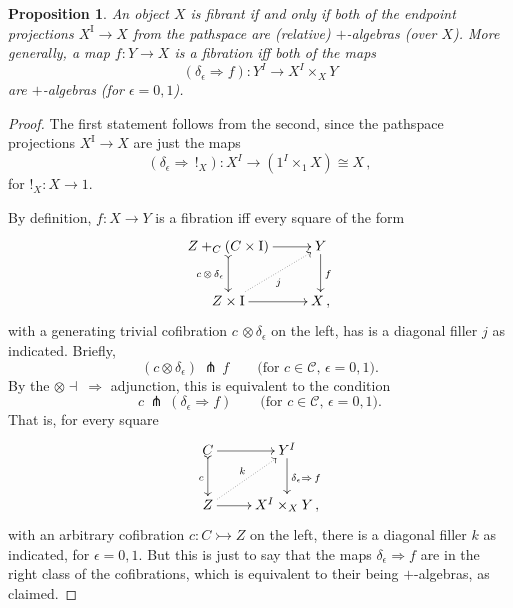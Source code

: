 \documentclass[12pt]{article}
\newcommand{\mono}{\ensuremath{\rightarrowtail}}
\newcommand{\ra}{\ensuremath{\rightarrow}}
\newcommand{\I}{\ensuremath{\mathrm{I}}}
\newtheorem{proposition}[theorem]{Proposition}
\theoremstyle{remark}
\theoremstyle{definition}
\begin{document}
\begin{proposition}\label{prop:algequivfill}
An object $X$ is fibrant if and only if both of the endpoint  projections $X^\I \ra X$ from the pathspace are (relative) $+$-algebras (over $X$). More generally, a map $f : Y\ra X$ is a fibration iff both of the maps $$(\delta_\epsilon \Rightarrow f) : Y^I \ra X^I\times_X Y$$ are $+$-algebras (for $\epsilon = 0,1$).
\end{proposition}
\begin{proof}
The first statement follows from the second, since the pathspace projections $X^\I \ra X$  are just the maps 
$$(\delta_\epsilon \Rightarrow\, !_X) : X^I \ra (1^I\times_1 X) \cong X\,,$$
for $!_X : X \ra 1$.

By definition, $f : X\ra Y$ is a fibration iff every square of the form
\begin{equation}
\xymatrix{
Z +_C (C\times\I) \ar@{>->}[d]_{c\, \otimes\, \delta_\epsilon} \ar[r] & Y \ar[d]^f \\
Z\times \I \ar@{.>}[ru]_{j} \ar[r] & X\,,
}
\end{equation}
with a generating trivial cofibration $c\, \otimes \delta_\epsilon$ on the left, has is a diagonal filler $j$ as indicated. Briefly,
\[
(c\otimes\delta_\epsilon)\, \pitchfork\, f \qquad\text{(for $c\in \mathcal{C}$, $\epsilon = 0,1$)}.
\]
By the $\otimes\dashv\ \Rightarrow$ adjunction, this is equivalent to the condition  
\[
c\, \pitchfork\, (\delta_\epsilon\!\Rightarrow\! f) \qquad\text{(for $c\in \mathcal{C}$, $\epsilon = 0,1$)}.
\]
That is, for every square 
\begin{equation*}
\xymatrix{
C \ar@{>->}[d]_{c} \ar[r] & Y^I \ar[d]^{\delta_\epsilon \Rightarrow\,f} \\
Z \ar@{.>}[ru]^{k} \ar[r] & X^I\times_X Y\,,
}
\end{equation*}
with an arbitrary cofibration $c : C \mono Z$ on the left, there is a diagonal filler $k$ as indicated, for  $\epsilon = 0,1$. 
But this is just to say that the maps $\delta_\epsilon\Rightarrow{f}$ are in the right class of the cofibrations, which is equivalent to their being $+$-algebras, as claimed.
\end{proof}
\end{document}
